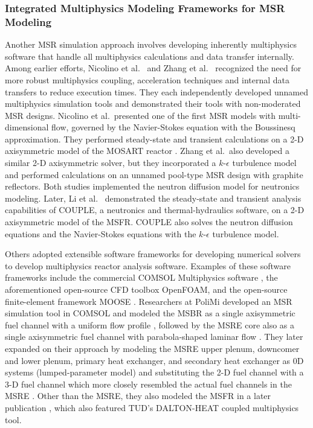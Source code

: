 \subsubsection{Integrated Multiphysics Modeling Frameworks for MSR Modeling}

Another \gls{MSR} simulation approach involves developing inherently multiphysics software that
handle all multiphysics calculations and data transfer internally. Among earlier efforts, Nicolino
et al.\ \cite{nicolino_coupled_2008} and Zhang et al.\ \cite{zhang_development_2009} recognized the
need for more robust multiphysics coupling, acceleration techniques and internal data transfers
to reduce execution times. They each independently developed unnamed multiphysics simulation tools
and demonstrated their tools with non-moderated \gls{MSR} designs. Nicolino et al.\ presented one
of the first \gls{MSR} models with multi-dimensional flow, governed by the Navier-Stokes equation
with the Boussinesq approximation. They performed steady-state and transient calculations on a 2-D
axisymmetric model of the \gls{MOSART} reactor \cite{ignatiev_molten_2014}. Zhang et al.\ also
developed a similar 2-D axisymmetric solver, but they incorporated a $k$-$\epsilon$ turbulence
model and performed calculations on an unnamed pool-type \gls{MSR} design with graphite reflectors.
Both studies implemented the neutron diffusion model for neutronics modeling.
Later, Li et al.\ \cite{li_transient_2015} demonstrated the
steady-state and transient analysis capabilities of COUPLE, a neutronics and
thermal-hydraulics software, on a 2-D axisymmetric model of the \gls{MSFR}. COUPLE also solves the
neutron diffusion equations and the Navier-Stokes equations with the $k$-$\epsilon$ turbulence
model.

Others adopted extensible software frameworks for developing numerical solvers
to develop multiphysics reactor analysis software. Examples of these software
frameworks include the commercial COMSOL
Multiphysics\textsuperscript{\textregistered} software
\cite{comsol_ab_comsol_nodate}, the aforementioned open-source CFD toolbox
OpenFOAM, and the open-source finite-element
framework \gls{MOOSE} \cite{gaston_physics-based_2015}. Researchers at
\gls{PoliMi} developed an \gls{MSR} simulation tool in COMSOL and
modeled the \gls{MSBR} as a single axisymmetric fuel channel with a uniform
flow profile \cite{cammi_multi-physics_2011}, followed by the \gls{MSRE} core
also as a single axisymmetric fuel channel with parabola-shaped laminar flow
\cite{cammi_dimensional_2012}. They later expanded on their approach by
modeling the \gls{MSRE} upper plenum, downcomer and lower plenum, primary heat
exchanger, and secondary heat exchanger as 0D systems (lumped-parameter model)
and substituting the 2-D fuel channel with a 3-D fuel channel which more closely
resembled the actual fuel channels in the \gls{MSRE}
\cite{zanetti_geometric_2015}. Other than the \gls{MSRE}, they also modeled the
\gls{MSFR} in a later publication \cite{fiorina_modelling_2014}, which also featured \gls{TUD}'s
DALTON-HEAT coupled multiphysics tool.

